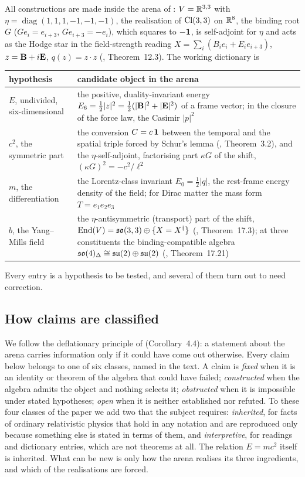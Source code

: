 All constructions are made inside the arena of \cite{ES17}: $V=\mathbb{R}^{3,3}$ with $\eta=\operatorname{diag}(1,1,1,-1,-1,-1)$, the realisation
of $\mathrm{Cl}(3,3)$ on $\mathbb{R}^8$, the binding root $G$ ($Ge_i=e_{i+3}$, $Ge_{i+3}=-e_i$), which squares to $-\mathbf 1$, is self-adjoint for $\eta$ and
acts as the Hodge star in the field-strength reading $X=\sum_i(B_ie_i+E_ie_{i+3})$, $z=\mathbf B+i\mathbf E$, $q(z)=z\cdot z$
(\cite{ES17}, Theorem~12.3). The working dictionary is
\begin{center}
\small
\begin{tabular}{@{}>{\raggedright\arraybackslash}p{3.4cm}>{\raggedright\arraybackslash}p{11.0cm}@{}}
\toprule
hypothesis & candidate object in the arena\\
\midrule
$E$, undivided, six-dimensional & the positive, duality-invariant energy $E_6=\tfrac12|z|^2=\tfrac12(|\mathbf B|^2+|\mathbf E|^2)$ of a frame vector; in
the closure of the force law, the Casimir $|p|^2$\\
$c^2$, the symmetric part & the conversion $C=c\,\mathbf 1$ between the temporal and the spatial triple forced by Schur's lemma
(\cite{ES17}, Theorem~3.2), and the $\eta$-self-adjoint, factorising part $\kappa G$ of the shift, $(\kappa G)^2=-c^2/\ell^2$\\
$m$, the differentiation & the Lorentz-class invariant $E_0=\tfrac12|q|$, the rest-frame energy density of the field; for Dirac matter the mass
form $T=e_1e_2e_3$\\
$b$, the Yang--Mills field & the $\eta$-antisymmetric (transport) part of the shift, $\operatorname{End}(V)=\mathfrak{so}(3,3)\oplus\{X=X^\dagger\}$
(\cite{ES17}, Theorem~17.3); at three constituents the binding-compatible algebra $\mathfrak{so}(4)_\Delta\cong\mathfrak{su}(2)\oplus\mathfrak{su}(2)$ (\cite{ES17},
Theorem~17.21)\\
\bottomrule
\end{tabular}
\end{center}
Every entry is a hypothesis to be tested, and several of them turn out to need correction.

\subsection{How claims are classified}

We follow the deflationary principle of \cite{ES17} (Corollary~4.4): a statement about the arena carries information only if it could
have come out otherwise. Every claim below belongs to one of six classes, named in the text. A claim is \emph{fixed} when it is an identity
or theorem of the algebra that could have failed; \emph{constructed} when the algebra admits the object and nothing selects it;
\emph{obstructed} when it is impossible under stated hypotheses; \emph{open} when it is neither established nor refuted. To these four
classes of the paper we add two that the subject requires: \emph{inherited}, for facts of ordinary relativistic physics that hold in any
notation and are reproduced only because something else is stated in terms of them, and \emph{interpretive}, for readings and dictionary
entries, which are not theorems at all. The relation $E=mc^2$ itself is inherited. What can be new is only how the arena realises its
three ingredients, and which of the realisations are forced.

